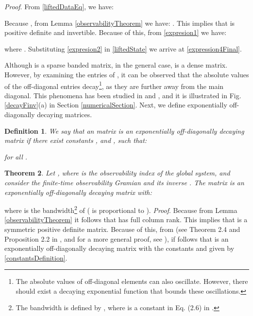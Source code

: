 \documentclass[journal,10pt]{IEEEtran}
\newtheorem{thm}{Theorem}[section]
\newtheorem{definition}[thm]{Definition}
\begin{document}
\textit{Proof}. From \eqref{liftedDataEq}, we have:
\begin{small}

\end{small}
Because , from Lemma \ref{observabilityTheorem} we have: . This implies that  is positive definite and invertible. Because of this, from \eqref{expresion1} we have:
\begin{small}

\end{small}
where . Substituting \eqref{expresion2} in  \eqref{liftedState} we arrive at \eqref{expression4Final}. 
\par
 Although  is a sparse banded matrix, in the general case,  is a dense matrix. However, by examining the entries of , it can be observed that the absolute values of the off-diagonal entries decay\footnote{The absolute values of off-diagonal elements can also oscillate. However, there should exist a decaying exponential function that bounds these oscillations.}, as they are further away from the main diagonal. This phenomena has been studied in \cite{benzi2007} and \cite{demko1984}, and it is illustrated in Fig. \ref{decayFinv}(a) in Section \ref{numericalSection}. Next, we define exponentially off-diagonally decaying matrices. \\
\begin{definition} \cite{benzi2007} We say that an  matrix  is an exponentially off-diagonally decaying matrix if there exist constants ,  and , such that:
\begin{small}

\end{small}
for all . \\ \end{definition} 
\begin{thm} Let , where  is the observability index of the global system, and consider the finite-time observability Gramian  and its inverse . The matrix  is an exponentially off-diagonally decaying matrix with:
\begin{small}

\end{small}
\label{mainTheoremSpatialDecay}
\end{thm}
where  is the bandwidth\footnote{The bandwidth  is defined by , where  is a constant in Eq. (2.6) in \cite{demko1984}.} of  ( is proportional to ).
\textit{Proof}. Because  from Lemma \ref{observabilityTheorem} it follows that  has full column rank. This implies that  is a symmetric positive definite matrix. Because of this, from \cite{demko1984} (see Theorem 2.4 and Proposition 2.2 in \cite{demko1984}, and for a more general proof, see \cite{benzi2007}), if follows that  is an exponentially off-diagonally decaying matrix with the
constants  and  given by \eqref{constantsDefinition}.  \\
\end{document}
